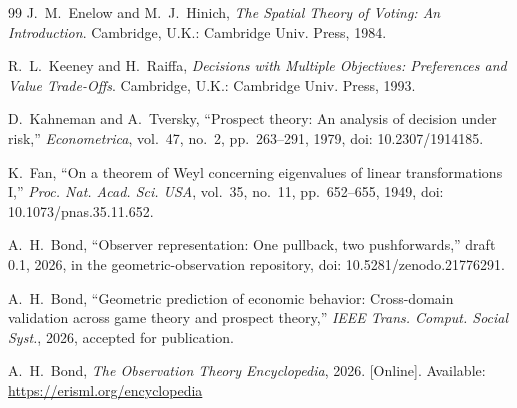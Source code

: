 \documentclass[11pt]{article}
\theoremstyle{definition}
\theoremstyle{remark}
\begin{document}
\begin{thebibliography}{99}
J.~M.~Enelow and M.~J.~Hinich, \emph{The Spatial Theory of Voting: An Introduction}. Cambridge, U.K.: Cambridge Univ. Press, 1984.

R.~L.~Keeney and H.~Raiffa, \emph{Decisions with Multiple Objectives: Preferences and Value Trade-Offs}. Cambridge, U.K.: Cambridge Univ. Press, 1993.

D.~Kahneman and A.~Tversky, ``Prospect theory: An analysis of decision under risk,'' \emph{Econometrica}, vol.~47, no.~2, pp.~263--291, 1979, doi: 10.2307/1914185.

K.~Fan, ``On a theorem of Weyl concerning eigenvalues of linear transformations I,'' \emph{Proc. Nat. Acad. Sci. USA}, vol.~35, no.~11, pp.~652--655, 1949, doi: 10.1073/pnas.35.11.652.

A.~H.~Bond, ``Observer representation: One pullback, two pushforwards,'' draft 0.1, 2026, in the geometric-observation repository, doi: 10.5281/zenodo.21776291.

A.~H.~Bond, ``Geometric prediction of economic behavior: Cross-domain validation across game theory and prospect theory,'' \emph{IEEE Trans. Comput. Social Syst.}, 2026, accepted for publication.

A.~H.~Bond, \emph{The Observation Theory Encyclopedia}, 2026. [Online]. Available: \url{https://erisml.org/encyclopedia}

\end{thebibliography}
\end{document}
